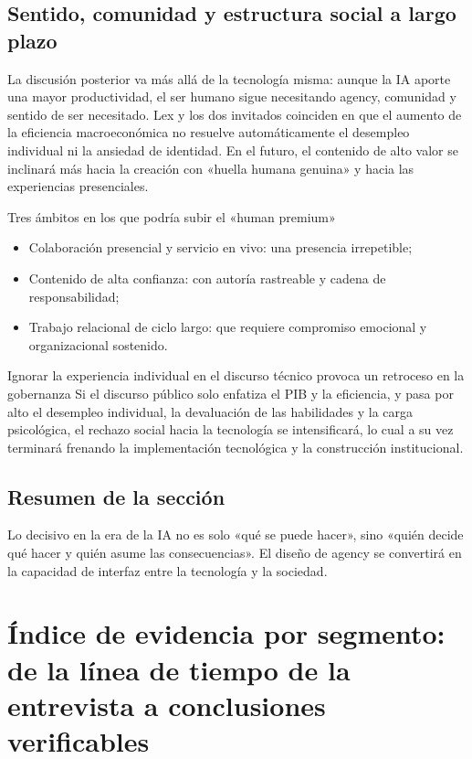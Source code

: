 \documentclass[a4paper]{article}
\begin{document}
\subsection{Sentido, comunidad y estructura social a largo plazo}

La discusión posterior va más allá de la tecnología misma: aunque la IA aporte una mayor productividad, el ser humano sigue necesitando agency, comunidad y sentido de ser necesitado. Lex y los dos invitados coinciden en que el aumento de la eficiencia macroeconómica no resuelve automáticamente el desempleo individual ni la ansiedad de identidad. En el futuro, el contenido de alto valor se inclinará más hacia la creación con «huella humana genuina» y hacia las experiencias presenciales.

\begin{knowledgebox}{Tres ámbitos en los que podría subir el «human premium»}
\begin{itemize}[leftmargin=1.5em]
    \item Colaboración presencial y servicio en vivo: una presencia irrepetible;
    \item Contenido de alta confianza: con autoría rastreable y cadena de responsabilidad;
    \item Trabajo relacional de ciclo largo: que requiere compromiso emocional y organizacional sostenido.
\end{itemize}
\end{knowledgebox}

\begin{warningbox}{Ignorar la experiencia individual en el discurso técnico provoca un retroceso en la gobernanza}
Si el discurso público solo enfatiza el PIB y la eficiencia, y pasa por alto el desempleo individual, la devaluación de las habilidades y la carga psicológica, el rechazo social hacia la tecnología se intensificará, lo cual a su vez terminará frenando la implementación tecnológica y la construcción institucional.
\end{warningbox}

\subsection{Resumen de la sección}

Lo decisivo en la era de la IA no es solo «qué se puede hacer», sino «quién decide qué hacer y quién asume las consecuencias». El diseño de agency se convertirá en la capacidad de interfaz entre la tecnología y la sociedad.
\section{Índice de evidencia por segmento: de la línea de tiempo de la entrevista a conclusiones verificables}
\end{document}
